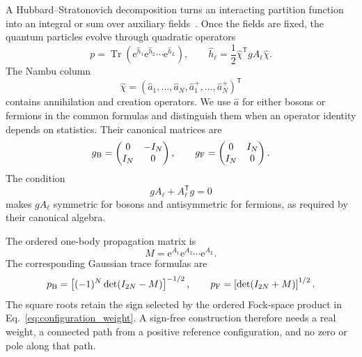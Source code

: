 \documentclass[onecolumn,aps,prb,amsmath,amssymb,superscriptaddress,longbibliography,floatfix]{revtex4-2}
\newcommand{\Tr}{\operatorname{Tr}}
\newcommand{\ee}{\mathrm{e}}
\newcommand{\trans}{\mathsf{T}}
\begin{document}
A Hubbard--Stratonovich decomposition turns an interacting partition function into an integral or sum over auxiliary fields~\cite{blankenbecler1981prd}.  Once the fields are fixed, the quantum particles evolve through quadratic operators
\begin{equation}
    p=\Tr\!\left(\ee^{\hat h_1}\ee^{\hat h_2}\cdots\ee^{\hat h_L}\right),
    \qquad
    \hat h_\ell=\frac12\hat\chi^\trans gA_\ell\hat\chi .
    \label{eq:configuration_weight}
\end{equation}
The Nambu column
\begin{equation}
    \hat\chi=(\hat a_1,\ldots,\hat a_N,
    \hat a_1^+,\ldots,\hat a_N^+)^\trans
    \label{eq:nambu_column}
\end{equation}
contains annihilation and creation operators.  We use \(\hat a\) for either bosons or fermions in the common formulas and distinguish them when an operator identity depends on statistics.  Their canonical matrices are
\begin{equation}
    g_{\rm B}=\begin{pmatrix}0&-I_N\\ I_N&0\end{pmatrix},
    \qquad
    g_{\rm F}=\begin{pmatrix}0&I_N\\ I_N&0\end{pmatrix}.
    \label{eq:canonical_g}
\end{equation}
The condition
\begin{equation}
    gA_\ell+A_\ell^\trans g=0
    \label{eq:quadratic_lie_algebra}
\end{equation}
makes \(gA_\ell\) symmetric for bosons and antisymmetric for fermions, as required by their canonical algebra.

The ordered one-body propagation matrix is
\begin{equation}
    M=\ee^{A_1}\ee^{A_2}\cdots\ee^{A_L}.
    \label{eq:propagation_matrix}
\end{equation}
The corresponding Gaussian trace formulas are~\cite{munn1978ensemble,klich2014jstat}
\begin{equation}
    p_{\rm B}=\left[(-1)^N\det(I_{2N}-M)\right]^{-1/2},
    \qquad
    p_{\rm F}=\left[\det(I_{2N}+M)\right]^{1/2}.
    \label{eq:gaussian_weights}
\end{equation}
The square roots retain the sign selected by the ordered Fock-space product in Eq.~\eqref{eq:configuration_weight}.  A sign-free construction therefore needs a real weight, a connected path from a positive reference configuration, and no zero or pole along that path.
\end{document}
